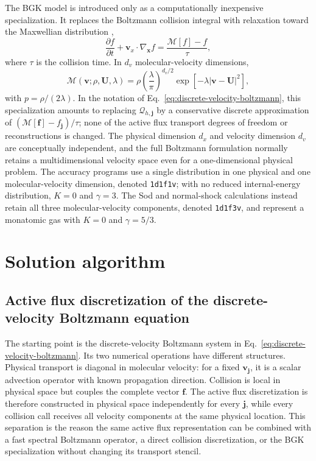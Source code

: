 \documentclass[preprint,3p,12pt]{elsarticle}
\newcommand{\vct}[1]{\boldsymbol{#1}}
\begin{document}
The BGK model is introduced only as a computationally inexpensive specialization. It replaces the Boltzmann collision integral with relaxation toward the Maxwellian distribution \cite{bhatnagar1954model},
\begin{equation}
  \frac{\partial f}{\partial t}
  + \vct{v}_x\cdot\nabla_{\vct{x}}f
  = \frac{\mathcal{M}[f]-f}{\tau},
  \label{eq:bgk}
\end{equation}
where $\tau$ is the collision time. In $d_v$ molecular-velocity dimensions,
\begin{equation}
  \mathcal{M}(\vct{v};\rho,\vct{U},\lambda)
  = \rho\left(\frac{\lambda}{\pi}\right)^{d_v/2}
    \exp\left[-\lambda|\vct{v}-\vct{U}|^2\right],
  \label{eq:maxwellian}
\end{equation}
with $p=\rho/(2\lambda)$. In the notation of Eq.~\eqref{eq:discrete-velocity-boltzmann}, this specialization amounts to replacing $\mathcal{Q}_{h,\vct{j}}$ by a conservative discrete approximation of $(\mathcal{M}[\vct{f}]-f_{\vct{j}})/\tau$; none of the active flux transport degrees of freedom or reconstructions is changed. The physical dimension $d_x$ and velocity dimension $d_v$ are conceptually independent, and the full Boltzmann formulation normally retains a multidimensional velocity space even for a one-dimensional physical problem. The accuracy programs use a single distribution in one physical and one molecular-velocity dimension, denoted \texttt{1d1f1v}; with no reduced internal-energy distribution, $K=0$ and $\gamma=3$. The Sod and normal-shock calculations instead retain all three molecular-velocity components, denoted \texttt{1d1f3v}, and represent a monatomic gas with $K=0$ and $\gamma=5/3$.

\section{Solution algorithm}
\label{sec:algorithm}

\subsection{Active flux discretization of the discrete-velocity Boltzmann equation}
\label{sec:active-flux-construction}

The starting point is the discrete-velocity Boltzmann system in Eq.~\eqref{eq:discrete-velocity-boltzmann}. Its two numerical operations have different structures. Physical transport is diagonal in molecular velocity: for a fixed $\vct{v}_{\vct{j}}$, it is a scalar advection operator with known propagation direction. Collision is local in physical space but couples the complete vector $\vct{f}$. The active flux discretization is therefore constructed in physical space independently for every $\vct{j}$, while every collision call receives all velocity components at the same physical location. This separation is the reason the same active flux representation can be combined with a fast spectral Boltzmann operator, a direct collision discretization, or the BGK specialization without changing its transport stencil.
\end{document}
